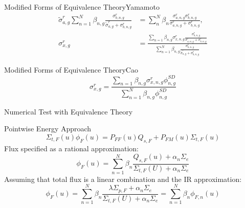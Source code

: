\documentclass[sans,mathserif,aspectratio=169, 10pt]{beamer}
\begin{document}
\begin{frame}{Modified Forms of Equivalence Theory}{Yamamoto}
\begin{align}
\tilde{\sigma}_{a,g}^r \sum_{n=1}^N \beta_{n,g} \frac{\sigma_{b,n,g}^r}{\tilde{\sigma}_{a,g}^r + \sigma_{b,n,g}^r} &= \sum_n^N  \beta_n \frac{\sigma_{a,n,g}^r\sigma_{b,n,g}^r}{\sigma_{a,n,g}^r + \sigma_{b,n,g}^r} , \\
\sigma_{x,g}^r &= \frac{\sum_{n=1} \beta_{n,g} \sigma_{x,n,g}^r \frac{\sigma_{b,n,g}^r}{\sigma_{a,n,g}^r + \sigma_{b,n,g}^r}}{\sum_{n=1}^N \beta_{n,g} \frac{\sigma_{b,n,g}^r}{\tilde{\sigma}_{a,g}^r + \sigma_{b,n,g}^r}}
\end{align}
\end{frame}

\begin{frame}{Modified Forms of Equivalence Theory}{Cao}
\begin{equation}
\sigma_{x,g}^r = \frac{\sum_{n=1} \beta_{n,g} \sigma_{x,n,g}^r \phi_{n,g}^{SD}}{\sum_{n=1}^N \beta_{n,g} \phi_{n,g}^{SD}}
\end{equation}
\end{frame}

\begin{frame}{Numerical Test with Equivalence Theory}
\centering
{}
\end{frame}

\begin{frame}{Pointwise Energy Approach}
\begin{equation}
\Sigma_{t,F} (u) \phi_F (u) = P_{FF} (u) Q_{s,F} + P_{FM} (u) \Sigma_{t,F} (u)
\end{equation}
\pause
Flux specified as a rational approximation:
\begin{equation}
\phi_F (u) = \sum_{n=1}^N \beta_n \frac{Q_{s,F}(u) + \alpha_n \Sigma_e}{\Sigma_{t,F} (U) + \alpha_n \Sigma_e}
\end{equation}
\pause
Assuming that total flux is a linear combination and the IR approximation:
\begin{equation}
\phi_F (u) = \sum_{n=1}^N \beta_n \frac{\lambda \Sigma_{p,F} + \alpha_n \Sigma_e}{\Sigma_{t,F} (U) + \alpha_n \Sigma_e} = \sum_{n=1}^N \beta_n \phi_{F,n} (u)
\end{equation}
\end{frame}
\end{document}
